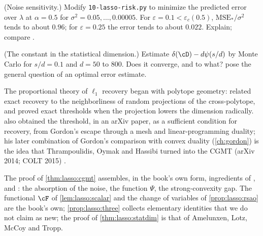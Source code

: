 \begin{refsection}
\begin{exercises}
\item \measurement (Noise sensitivity.) Modify \texttt{10-lasso-risk.py} to minimize the predicted error over $\lambda$ at $\alpha=0.5$ for $\sigma^2=0.05,\dots,0.00005$. For $\varepsilon=0.1<\varepsilon_c(0.5)$, $\mathrm{MSE}_*/\sigma^2$ tends to about $0.96$; for $\varepsilon=0.25$ the error tends to about $0.022$. Explain; compare \textcite{DonohoEtAl2011}.\label{ex:lasso:noisesens}

\item \research (The constant in the statistical dimension.) Estimate $\delta(\cD)-d\psi(s/d)$ by Monte Carlo for $s/d=0.1$ and $d=50$ to $800$. Does it converge, and to what? \textcite[Remark~4.4]{AmelunxenEtAl2014} pose the general question of an optimal error estimate.\label{ex:lasso:finitesize}
\end{exercises}

\notesandrefs
The proportional theory of $\ell_1$ recovery began with polytope geometry: \textcite{Donoho2006} related exact recovery to the neighborliness of random projections of the cross-polytope, and \textcite{DonohoTanner2009a} proved exact thresholds when the projection lowers the dimension radically. \Textcite{Stojnic2009} also obtained the threshold, in an arXiv paper, as a sufficient condition for recovery, from Gordon's escape through a mesh \parencite{Gordon1988} and linear-programming duality; his later combination of Gordon's comparison with convex duality (\cref{ch:gordon}) is the idea that Thrampoulidis, Oymak and Hassibi turned into the CGMT (arXiv 2014; COLT 2015) \parencite{ThrampoulidisOymakHassibi2014,ThrampoulidisOymakHassibi2015}.

The proof of \cref{thm:lasso:cgmt} assembles, in the book's own form, ingredients of \textcite{ThrampoulidisOymakHassibi2015}, \textcite{ThrampoulidisAbbasiHassibi2018} and \textcite{MiolaneMontanari2021}: the absorption of the noise, the function $\Psi$, the strong-convexity gap. The functional $\cF$ of \cref{lem:lasso:scalar} and the change of variables of \cref{prop:lasso:rsao} are the book's own; \cref{prop:lasso:three} collects elementary identities that we do not claim as new; the proof of \cref{thm:lasso:statdim} is that of Amelunxen, Lotz, McCoy and Tropp.


\end{refsection}
